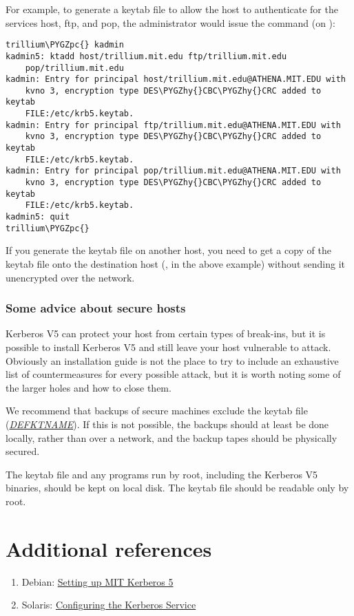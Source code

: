 \documentclass[letterpaper,10pt,english]{sphinxmanual}
\def\PYGZpc{\char`\%}
\def\PYGZhy{\char`\-}
\begin{document}
For example, to generate a keytab file to allow the host
 to authenticate for the services host, ftp, and
pop, the administrator  would issue the command (on
):

\begin{Verbatim}[commandchars=\\\{\}]
trillium\PYGZpc{} kadmin
kadmin5: ktadd host/trillium.mit.edu ftp/trillium.mit.edu
    pop/trillium.mit.edu
kadmin: Entry for principal host/trillium.mit.edu@ATHENA.MIT.EDU with
    kvno 3, encryption type DES\PYGZhy{}CBC\PYGZhy{}CRC added to keytab
    FILE:/etc/krb5.keytab.
kadmin: Entry for principal ftp/trillium.mit.edu@ATHENA.MIT.EDU with
    kvno 3, encryption type DES\PYGZhy{}CBC\PYGZhy{}CRC added to keytab
    FILE:/etc/krb5.keytab.
kadmin: Entry for principal pop/trillium.mit.edu@ATHENA.MIT.EDU with
    kvno 3, encryption type DES\PYGZhy{}CBC\PYGZhy{}CRC added to keytab
    FILE:/etc/krb5.keytab.
kadmin5: quit
trillium\PYGZpc{}
\end{Verbatim}

If you generate the keytab file on another host, you need to get a
copy of the keytab file onto the destination host (, in
the above example) without sending it unencrypted over the network.


\subsubsection{Some advice about secure hosts}
\label{admin/install_appl_srv:some-advice-about-secure-hosts}
Kerberos V5 can protect your host from certain types of break-ins, but
it is possible to install Kerberos V5 and still leave your host
vulnerable to attack.  Obviously an installation guide is not the
place to try to include an exhaustive list of countermeasures for
every possible attack, but it is worth noting some of the larger holes
and how to close them.

We recommend that backups of secure machines exclude the keytab file
({\hyperref[mitK5defaults:paths]{\emph{DEFKTNAME}}}).  If this is not possible, the backups should at least be
done locally, rather than over a network, and the backup tapes should
be physically secured.

The keytab file and any programs run by root, including the Kerberos
V5 binaries, should be kept on local disk.  The keytab file should be
readable only by root.


\section{Additional references}
\label{admin/install:additional-references}\begin{enumerate}
\item {} 
Debian: \href{http://techpubs.spinlocksolutions.com/dklar/kerberos.html}{Setting up MIT Kerberos 5}

\item {} 
Solaris: \href{http://download.oracle.com/docs/cd/E19253-01/816-4557/6maosrjv2/index.html}{Configuring the Kerberos Service}

\end{enumerate}
\end{document}
